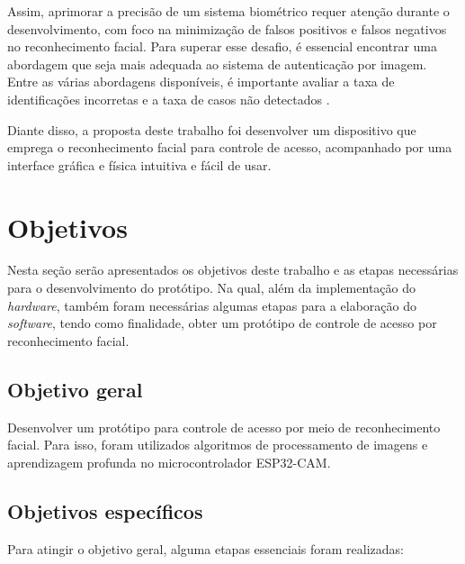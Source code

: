 Assim, aprimorar a precisão de um sistema biométrico requer atenção 
durante o desenvolvimento, com foco na minimização de falsos 
positivos e falsos negativos no reconhecimento facial. Para superar esse 
desafio, é essencial encontrar uma abordagem que seja mais adequada ao 
sistema de autenticação por imagem. Entre as várias abordagens disponíveis, 
é importante avaliar a taxa de identificações incorretas e a taxa de 
casos não detectados \cite{viola2004}.


Diante disso, a proposta deste trabalho foi desenvolver um dispositivo que emprega 
o reconhecimento facial para controle de acesso, acompanhado por 
uma interface gráfica e física intuitiva e fácil de usar.

\section{Objetivos}\label{sec:objetivos}

Nesta seção serão apresentados os objetivos deste trabalho e as etapas necessárias 
para o desenvolvimento do protótipo. Na qual, além da implementação do 
\textit{hardware}, também foram necessárias algumas etapas para a elaboração do \textit{software}, 
tendo como finalidade, obter um protótipo de controle de acesso por 
reconhecimento facial.

\subsection{Objetivo geral}\label{subsec:objetivoGeral}

Desenvolver um protótipo para controle de acesso por meio de reconhecimento facial. 
Para isso, foram utilizados algoritmos de processamento de imagens e aprendizagem 
profunda no microcontrolador ESP32-CAM.

\subsection{Objetivos específicos}\label{subsec:objetivosEspecificos}

Para atingir o objetivo geral, alguma etapas essenciais foram realizadas:

